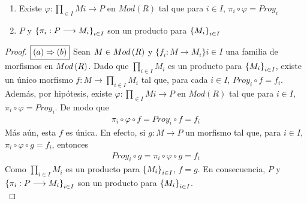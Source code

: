 \documentclass{article}
\begin{document}
\begin{enumerate}[label=\textbf{Ej \arabic*.}]
	\begin{enumerate}
		\item Existe $\varphi : \displaystyle\prod_{\in I} Mi \longrightarrow P$ en $Mod(R)$ tal que para $i \in I$, $\pi_{i}\circ\varphi = Proy_{i}$
		\item $P$ y $\left\{\pi_{i}: P \longrightarrow M_{i}\right\}_{i \in I}$ son un producto para ${\left\{{M}_{i}\right\}}_{i\in I}$
	\end{enumerate}
	\begin{proof}
		$\boxed{\left(a\right)\Rightarrow\left(b\right)}$ Sean $M \in Mod\left(R\right)$ y $\{f_{i}:M \longrightarrow M_{i}\}{i \in I}$ una familia de morfismos en $Mod\left(R\right)$. Dado que $\displaystyle\prod_{i \in I}M_{i}$ es un producto para ${\left\{{M}_{i}\right\}}_{i\in I}$, existe un único morfismo $f:M\longrightarrow\displaystyle\prod_{i \in I}M_{i}$ tal que, para cada $i \in I$, $Proy_{i} \circ f = f_{i}$. Además, por hipótesis, existe $\varphi : \displaystyle\prod_{\in I} Mi \longrightarrow P$ en $Mod(R)$ tal que para $i \in I$, $\pi_{i}\circ\varphi = Proy_{i}$. De modo que 
		\begin{align*}
			\pi_{i}\circ\varphi\circ f = Proy_{i} \circ f = f_{i}
		\end{align*}
		Más aún, esta $f$ es única. En efecto, si $g:M \longrightarrow P$ un morfismo tal que, para $i \in I$, $\pi_{i}\circ\varphi\circ g = f_{i}$, entonces
		\begin{align*}
			Proy_{i} \circ g = \pi_{i}\circ\varphi\circ g = f_{i}
		\end{align*}
		Como $\displaystyle\prod_{i \in I}M_{i}$ es un producto para ${\left\{{M}_{i}\right\}}_{i\in I}$, $f=g$. En consecuencia, $P$ y $\left\{\pi_{i}: P \longrightarrow M_{i}\right\}_{i \in I}$ son un producto para ${\left\{{M}_{i}\right\}}_{i\in I}$.\\
		

\end{proof}
\end{enumerate}
\end{document}
